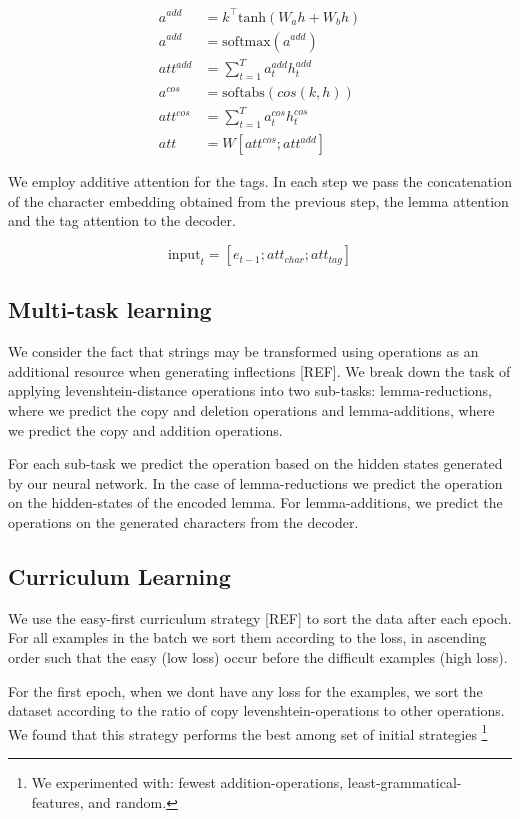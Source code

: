 \documentclass[11pt,a4paper]{article}
\begin{document}
\begin{align*}
	a^{add} & = k^\top\text{tanh}(W_ah + W_bh)\\
    a^{add} & = \text{softmax}(a^{add})\\
	att^{add} & = \sum_{t=1}^{T}a_t^{add}h_t^{add}\\
	a^{cos} & = \text{softabs}(cos(k,h))\\
	att^{cos} & = \sum_{t=1}^{T}a_t^{cos}h_t^{cos}\\
	att & = W[att^{cos}; att^{add}]
\end{align*}

We employ additive attention for the tags. In each step we pass the
concatenation of the character embedding obtained from the previous
step, the lemma attention and the tag attention to the decoder.

\begin{equation*}
\text{input}_t = [e_{t-1}; att_{char}; att_{tag}]
\end{equation*}



\subsection{Multi-task learning}

We consider the fact that strings may be transformed using operations
as an additional resource when generating inflections [REF]. 
We break down the task of applying levenshtein-distance operations
into two sub-tasks: lemma-reductions, where we predict the copy and
deletion operations and lemma-additions, where we predict the copy and
addition operations. 

For each sub-task we predict the operation based on the hidden states
generated by our neural network. In the case of lemma-reductions we
predict the operation on the hidden-states of the encoded lemma. For
lemma-additions, we predict the operations on the generated characters
from the decoder.

\subsection{Curriculum Learning}

We use the easy-first curriculum strategy [REF] to sort the data after
each epoch. For all examples in the batch we sort them according to
the loss, in ascending order such that the easy (low loss) occur
before the difficult examples (high loss).  

For the first epoch, when we dont have any loss for the examples, we
sort the dataset according to the ratio of copy levenshtein-operations
to other operations. We found that this strategy performs the best
among set of initial strategies \footnote{We experimented with: fewest
addition-operations, least-grammatical-features, and random.}
\end{document}
